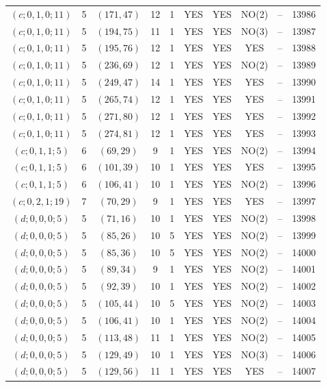 \begin{longtable}{|c|c|c|c|c|c|c|c|c|c|}
$(c; 0, 1, 0; 11)$ & 5 & $(171, 47)$ & 12 & 1 & YES & YES & NO(2) & -- & 13986\\
$(c; 0, 1, 0; 11)$ & 5 & $(194, 75)$ & 11 & 1 & YES & YES & NO(3) & -- & 13987\\
$(c; 0, 1, 0; 11)$ & 5 & $(195, 76)$ & 12 & 1 & YES & YES & YES & -- & 13988\\
$(c; 0, 1, 0; 11)$ & 5 & $(236, 69)$ & 12 & 1 & YES & YES & NO(2) & -- & 13989\\
$(c; 0, 1, 0; 11)$ & 5 & $(249, 47)$ & 14 & 1 & YES & YES & YES & -- & 13990\\
$(c; 0, 1, 0; 11)$ & 5 & $(265, 74)$ & 12 & 1 & YES & YES & YES & -- & 13991\\
$(c; 0, 1, 0; 11)$ & 5 & $(271, 80)$ & 12 & 1 & YES & YES & YES & -- & 13992\\
$(c; 0, 1, 0; 11)$ & 5 & $(274, 81)$ & 12 & 1 & YES & YES & YES & -- & 13993\\
$(c; 0, 1, 1; 5)$ & 6 & $(69, 29)$ & 9 & 1 & YES & YES & NO(2) & -- & 13994\\
$(c; 0, 1, 1; 5)$ & 6 & $(101, 39)$ & 10 & 1 & YES & YES & YES & -- & 13995\\
$(c; 0, 1, 1; 5)$ & 6 & $(106, 41)$ & 10 & 1 & YES & YES & NO(2) & -- & 13996\\
$(c; 0, 2, 1; 19)$ & 7 & $(70, 29)$ & 9 & 1 & YES & YES & YES & -- & 13997\\
$(d; 0, 0, 0; 5)$ & 5 & $(71, 16)$ & 10 & 1 & YES & YES & NO(2) & -- & 13998\\
$(d; 0, 0, 0; 5)$ & 5 & $(85, 26)$ & 10 & 5 & YES & YES & NO(2) & -- & 13999\\
$(d; 0, 0, 0; 5)$ & 5 & $(85, 36)$ & 10 & 5 & YES & YES & NO(2) & -- & 14000\\
$(d; 0, 0, 0; 5)$ & 5 & $(89, 34)$ & 9 & 1 & YES & YES & NO(2) & -- & 14001\\
$(d; 0, 0, 0; 5)$ & 5 & $(92, 39)$ & 10 & 1 & YES & YES & NO(2) & -- & 14002\\
$(d; 0, 0, 0; 5)$ & 5 & $(105, 44)$ & 10 & 5 & YES & YES & NO(2) & -- & 14003\\
$(d; 0, 0, 0; 5)$ & 5 & $(106, 41)$ & 10 & 1 & YES & YES & NO(2) & -- & 14004\\
$(d; 0, 0, 0; 5)$ & 5 & $(113, 48)$ & 11 & 1 & YES & YES & NO(2) & -- & 14005\\
$(d; 0, 0, 0; 5)$ & 5 & $(129, 49)$ & 10 & 1 & YES & YES & NO(3) & -- & 14006\\
$(d; 0, 0, 0; 5)$ & 5 & $(129, 56)$ & 11 & 1 & YES & YES & YES & -- & 14007\\

\end{longtable}
